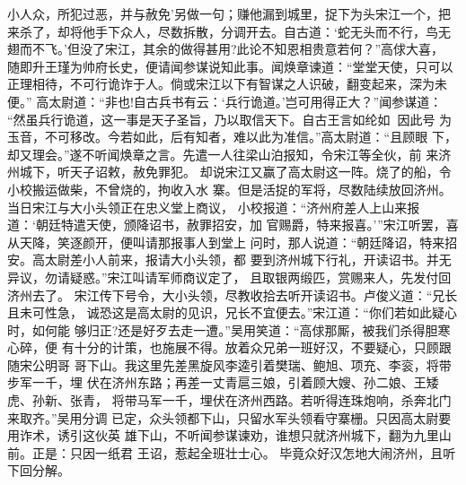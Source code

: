 小人众，所犯过恶，并与赦免’另做一句；赚他漏到城里，捉下为头宋江一个，把
来杀了，却将他手下众人，尽数拆散，分调开去。自古道：‘蛇无头而不行，鸟无
翅而不飞。’但没了宋江，其余的做得甚用?此论不知恩相贵意若何？”高俅大喜，
随即升王瑾为帅府长史，便请闻参谋说知此事。闻焕章谏道：“堂堂天使，只可以
正理相待，不可行诡诈于人。倘或宋江以下有智谋之人识破，翻变起来，深为未便。”
高太尉道：“非也!自古兵书有云：‘兵行诡道。’岂可用得正大？”闻参谋道：
“然虽兵行诡道，这一事是天子圣旨，乃以取信天下。自古王言如纶如，因此号
为玉音，不可移改。今若如此，后有知者，难以此为准信。”高太尉道：“且顾眼
下，却又理会。”遂不听闻焕章之言。先遣一人往梁山泊报知，令宋江等全伙，前
来济州城下，听天子诏敕，赦免罪犯。
却说宋江又赢了高太尉这一阵。烧了的船，令小校搬运做柴，不曾烧的，拘收入水
寨。但是活捉的军将，尽数陆续放回济州。当日宋江与大小头领正在忠义堂上商议，
小校报道：“济州府差人上山来报道：‘朝廷特遣天使，颁降诏书，赦罪招安，加
官赐爵，特来报喜。’”宋江听罢，喜从天降，笑逐颜开，便叫请那报事人到堂上
问时，那人说道：“朝廷降诏，特来招安。高太尉差小人前来，报请大小头领，都
要到济州城下行礼，开读诏书。并无异议，勿请疑惑。”宋江叫请军师商议定了，
且取银两缎匹，赏赐来人，先发付回济州去了。
宋江传下号令，大小头领，尽教收拾去听开读诏书。卢俊义道：“兄长且未可性急，
诚恐这是高太尉的见识，兄长不宜便去。”宋江道：“你们若如此疑心时，如何能
够归正?还是好歹去走一遭。”吴用笑道：“高俅那厮，被我们杀得胆寒心碎，便
有十分的计策，也施展不得。放着众兄弟一班好汉，不要疑心，只顾跟随宋公明哥
哥下山。我这里先差黑旋风李逵引着樊瑞、鲍旭、项充、李衮，将带步军一千，埋
伏在济州东路；再差一丈青扈三娘，引着顾大嫂、孙二娘、王矮虎、孙新、张青，
将带马军一千，埋伏在济州西路。若听得连珠炮响，杀奔北门来取齐。”吴用分调
已定，众头领都下山，只留水军头领看守寨栅。只因高太尉要用诈术，诱引这伙英
雄下山，不听闻参谋谏劝，谁想只就济州城下，翻为九里山前。正是：只因一纸君
王诏，惹起全班壮士心。
毕竟众好汉怎地大闹济州，且听下回分解。